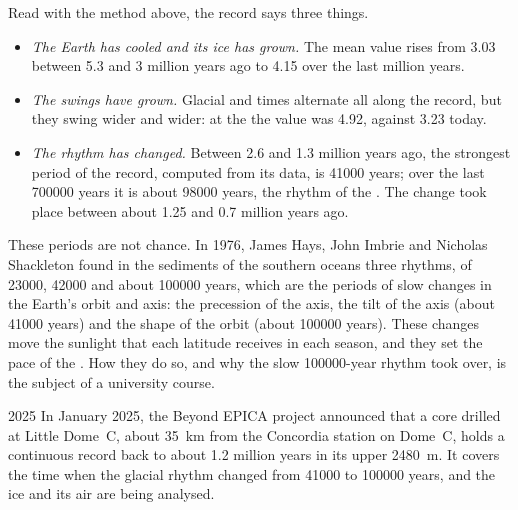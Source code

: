Read with the method above, the record says three things.
\begin{itemize}
  \item \emph{The Earth has cooled and its ice has grown.} The mean value
        rises from \qty{3.03}{\permil} between 5.3 and 3 million years
        ago to \qty{4.15}{\permil} over the last million years.
  \item \emph{The swings have grown.} Glacial and  times
        alternate all along the record, but they swing wider and wider: at
        the  the value was \qty{4.92}{\permil}, against
        \qty{3.23}{\permil} today.
  \item \emph{The rhythm has changed.} Between 2.6 and 1.3 million years
        ago, the strongest period of the record, computed from its data, is
        \num{41000} years; over the last \num{700000} years it is about
        \num{98000} years, the rhythm of the . The change took
        place between about 1.25 and 0.7 million years ago.
\end{itemize}

These periods are not chance. In 1976, James Hays, John Imbrie and Nicholas
Shackleton found in the sediments of the southern oceans three rhythms, of
\num{23000}, \num{42000} and about \num{100000} years, which are the periods
of slow changes in the Earth's orbit and axis: the precession of the axis,
the tilt of the axis (about \num{41000} years) and the shape of the orbit
(about \num{100000} years). These changes move the sunlight that each
latitude receives in each season, and they set the pace of the . How they do so, and why the slow \num{100000}-year rhythm took
over, is the subject of a university course.

\begin{dated}{2025}
In January 2025, the Beyond EPICA project announced that a core drilled at
Little Dome~C, about \qty{35}{km} from the Concordia station on Dome~C, holds
a continuous record back to about 1.2 million years in its upper
\qty{2480}{m}. It covers the time
when the glacial rhythm changed from \num{41000} to \num{100000} years, and the
ice and its air are being analysed.
\end{dated}

